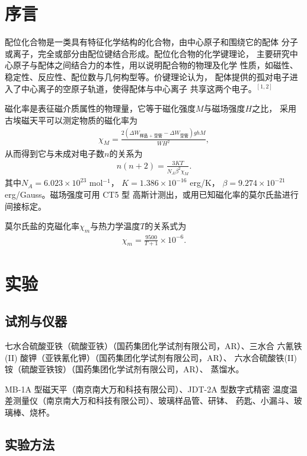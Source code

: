 \documentclass[12pt]{ctexart}
\numberwithin{equation}{section}
\begin{document}
\section{序言}

配位化合物是一类具有特征化学结构的化合物，由中心原子和围绕它的配体
分子或离子，完全或部分由配位键结合形成。配位化合物的化学键理论，
主要研究中心原子与配体之间结合力的本性，用以说明配合物的物理及化学
性质，如磁性、稳定性、反应性、配位数与几何构型等。价键理论认为，
配体提供的孤对电子进入了中心离子的空原子轨道，使得配体与中心离子
共享这两个电子。$^{[1, 2]}$

磁化率是表征磁介质属性的物理量，它等于磁化强度$M$与磁场强度$H$之比，
采用古埃磁天平可以测定物质的磁化率为
\begin{align}
    \chi_M
    = \frac{2(\Delta W_{\text{样品 + 空管}}
            - \Delta W_{\text{空管}})ghM}
        {WH^2},
\end{align}
从而得到它与未成对电子数$n$的关系为
\begin{align}
    n(n + 2) = \frac{3KT}{N_A \beta^2 \chi_M}.
\end{align}
其中$N_A = 6.023\times 10^{23}$ mol$^{-1}$，
$K = 1.386\times 10^{-16}$ erg/K，
$\beta = 9.274\times 10^{-21}$ erg/Gauss。磁场强度可用 CT5 型
高斯计测出，或用已知磁化率的莫尔氏盐进行间接标定。

莫尔氏盐的克磁化率$\chi_m$与热力学温度$T$的关系式为
\begin{align}
    \chi_m = \frac{9500}{T + 1}\times 10^{-6}.
\end{align}

\section{实验}
\subsection{试剂与仪器}

七水合硫酸亚铁（硫酸亚铁）（国药集团化学试剂有限公司，AR）、三水合
六氰铁(II) 酸钾（亚铁氰化钾）（国药集团化学试剂有限公司，AR）、
六水合硫酸铁(II) 铵（硫酸亚铁铵）（国药集团化学试剂有限公司，AR）、
蒸馏水。

MB-1A 型磁天平（南京南大万和科技有限公司）、JDT-2A 型数字式精密
温度温差测量仪（南京南大万和科技有限公司）、玻璃样品管、研钵、
药匙、小漏斗、玻璃棒、烧杯。

\subsection{实验方法}
\end{document}
